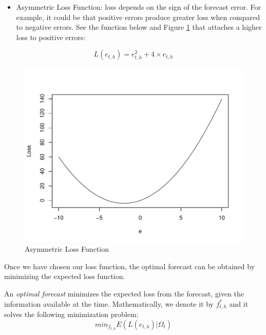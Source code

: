 \documentclass[]{book}
\providecommand{\tightlist}{%
  \setlength{\itemsep}{0pt}\setlength{\parskip}{0pt}}
\theoremstyle{definition}
\theoremstyle{definition}
\theoremstyle{definition}
\theoremstyle{remark}
\let\BeginKnitrBlock\begin \let\EndKnitrBlock\end
\begin{document}
\begin{itemize}
\tightlist
\item
  Asymmetric Loss Function: loss depends on the sign of the forecast
  error. For example, it could be that positive errors produce greater
  loss when compared to negative errors. See the function below and
  Figure \ref{fig:ch1-figure6} that attaches a higher loss to positive
  errors:
\end{itemize}

\begin{equation}
L(e_{t,h})=e_{t,h}^2+4 \times e_{t,h}
\end{equation}

\begin{figure}

{\centering \includegraphics[width=0.8\linewidth]{bookdown-demo_files/figure-latex/ch1-figure6-1} 

}

\caption{Asymmetric Loss Function}\label{fig:ch1-figure6}
\end{figure}

Once we have chosen our loss function, the optimal forecast can be
obtained by minimizing the expected loss function.

\BeginKnitrBlock{definition}[Optimal Forecast]
\protect\hypertarget{def:d6}{}{\label{def:d6} {} }
\EndKnitrBlock{definition}

An \emph{optimal forecast} minimizes the expected loss from the
forecast, given the information available at the time. Mathematically,
we denote it by \(f^*_{t,h}\) and it solves the following minimization
problem: \begin{equation}
min_{f_{t,h}} E(L(e_{t,h})|\Omega_t)
\end{equation}
\end{document}

